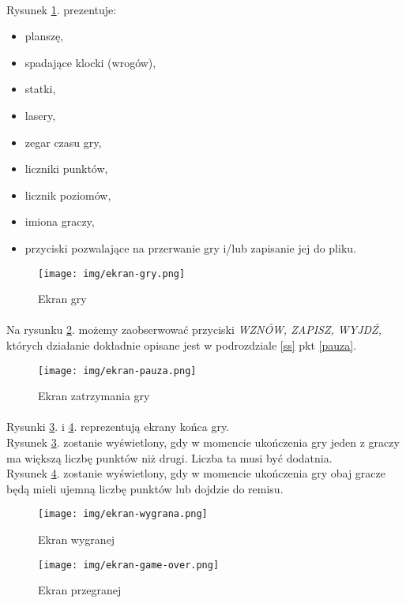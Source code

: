 \documentclass[a4paper]{article}
\begin{document}
\newpage

\paragraph{}Rysunek \ref{fig:gra}. prezentuje:
\begin{itemize}
    \item planszę,
    \item spadające klocki (wrogów),
    \item statki,
    \item lasery,
    \item zegar czasu gry,
    \item liczniki punktów,
    \item licznik poziomów,
    \item imiona graczy,
    \item przyciski pozwalające na przerwanie gry i/lub zapisanie jej do pliku.
\end{itemize}
\begin{figure}[H]
    \centering
    \texttt{[image: img/ekran-gry.png]}
    \caption{Ekran gry}
    \label{fig:gra}
\end{figure}

\newpage

\paragraph{}Na rysunku \ref{fig:pauza}. możemy zaobserwować przyciski \textit{WZNÓW, ZAPISZ, WYJDŹ,} których działanie dokładnie opisane jest w podrozdziale \ref{ss} pkt \ref{pauza}.
\begin{figure}[H]
    \centering
    \texttt{[image: img/ekran-pauza.png]}
    \caption{Ekran zatrzymania gry}
    \label{fig:pauza}
\end{figure}

\newpage

\paragraph{}Rysunki \ref{fig:wygrana}. i \ref{fig:game over}. reprezentują ekrany końca gry.\\
Rysunek \ref{fig:wygrana}. zostanie wyświetlony, gdy w momencie ukończenia gry jeden z graczy ma większą liczbę punktów niż drugi. Liczba ta musi być dodatnia.\\
Rysunek \ref{fig:game over}. zostanie wyświetlony, gdy w momencie ukończenia gry obaj gracze będą mieli ujemną liczbę punktów lub dojdzie do remisu.
\begin{figure}[H]
    \centering
    \texttt{[image: img/ekran-wygrana.png]}
    \caption{Ekran wygranej}
    \label{fig:wygrana}
\end{figure}
\begin{figure}[H]
    \centering
    \texttt{[image: img/ekran-game-over.png]}
    \caption{Ekran przegranej}
    \label{fig:game over}
\end{figure}
\end{document}
